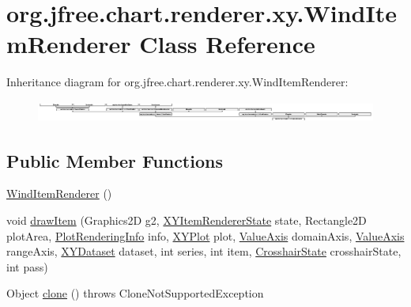 \hypertarget{classorg_1_1jfree_1_1chart_1_1renderer_1_1xy_1_1_wind_item_renderer}{}\section{org.\+jfree.\+chart.\+renderer.\+xy.\+Wind\+Item\+Renderer Class Reference}
\label{classorg_1_1jfree_1_1chart_1_1renderer_1_1xy_1_1_wind_item_renderer}
Inheritance diagram for org.\+jfree.\+chart.\+renderer.\+xy.\+Wind\+Item\+Renderer\+:\begin{figure}[H]
\begin{center}
\leavevmode
\includegraphics[height=0.706625cm]{classorg_1_1jfree_1_1chart_1_1renderer_1_1xy_1_1_wind_item_renderer}
\end{center}
\end{figure}
\subsection*{Public Member Functions}
\begin{DoxyCompactItemize}
\item 
\mbox{\hyperlink{classorg_1_1jfree_1_1chart_1_1renderer_1_1xy_1_1_wind_item_renderer_a8f9553606fe2028eb20bc85e8e27a0b6}{Wind\+Item\+Renderer}} ()
\item 
void \mbox{\hyperlink{classorg_1_1jfree_1_1chart_1_1renderer_1_1xy_1_1_wind_item_renderer_aaec0be3d285a25179399bef29cfb9812}{draw\+Item}} (Graphics2D g2, \mbox{\hyperlink{classorg_1_1jfree_1_1chart_1_1renderer_1_1xy_1_1_x_y_item_renderer_state}{X\+Y\+Item\+Renderer\+State}} state, Rectangle2D plot\+Area, \mbox{\hyperlink{classorg_1_1jfree_1_1chart_1_1plot_1_1_plot_rendering_info}{Plot\+Rendering\+Info}} info, \mbox{\hyperlink{classorg_1_1jfree_1_1chart_1_1plot_1_1_x_y_plot}{X\+Y\+Plot}} plot, \mbox{\hyperlink{classorg_1_1jfree_1_1chart_1_1axis_1_1_value_axis}{Value\+Axis}} domain\+Axis, \mbox{\hyperlink{classorg_1_1jfree_1_1chart_1_1axis_1_1_value_axis}{Value\+Axis}} range\+Axis, \mbox{\hyperlink{interfaceorg_1_1jfree_1_1data_1_1xy_1_1_x_y_dataset}{X\+Y\+Dataset}} dataset, int series, int item, \mbox{\hyperlink{classorg_1_1jfree_1_1chart_1_1plot_1_1_crosshair_state}{Crosshair\+State}} crosshair\+State, int pass)
\item 
Object \mbox{\hyperlink{classorg_1_1jfree_1_1chart_1_1renderer_1_1xy_1_1_wind_item_renderer_a5fde075f55d8960c4f5318b09c558962}{clone}} ()  throws Clone\+Not\+Supported\+Exception 
\end{DoxyCompactItemize}

